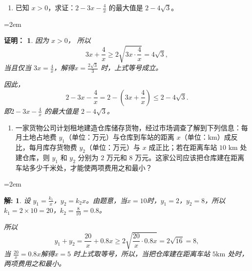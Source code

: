 \documentclass[aspectratio=169,13pt,fleqn,t] {beamer}
\newtheorem*{prooft}{证明：}
\newtheorem*{solve}{解:}
\begin{document}
\begin{frame}
	\begin{enumerate}[7.]
		\item 已知 \(x > 0\)，求证：\(2 - 3x - \frac{4}{x}\) 的最大值是 \(2 - 4\sqrt{3}\)。
	\end{enumerate}
	
	\leftskip=2em
	\begin{minipage}{0.8\textwidth}
		
		\begin{prooft}
			 因为 \(x > 0\)，
			 所以 \[3x + \frac{4}{x} \geqslant 2\sqrt{3x \cdot \frac{4}{x}} = 4\sqrt{3},\]
			 当且仅当 \(3x = \frac{4}{x}\)，解得$x=\frac{2\sqrt{3}}{3}$ 时，上式等号成立。
			 
			 因此，
			 \[
			 2 - 3x - \frac{4}{x} = 2 - \left(3x + \frac{4}{x}\right) \leqslant 2 - 4\sqrt{3}.
			 \]
			 即\(2 - 3x - \frac{4}{x}\) 的最大值是 \(2 - 4\sqrt{3}\)。
		\end{prooft}
	\end{minipage}
	
\end{frame}


\begin{frame}
	\begin{enumerate}[8.]
		\item 一家货物公司计划租地建造仓库储存货物，经过市场调查了解到下列信息：每月土地占地费 \(y_1\)（单位：万元）与仓库到车站的距离 \(x\)（单位：\(\text{km}\)）成反比，每月库存货物费 \(y_2\)（单位：万元）与 \(x\) 成正比；若在距离车站 \(10\text{ km}\) 处建仓库，则 \(y_1\) 和 \(y_2\) 分别为 \(2\) 万元和 \(8\) 万元。这家公司应该把仓库建在距离车站多少千米处，才能使两项费用之和最小？
	\end{enumerate}
	
	\leftskip=2em
	\begin{minipage}{0.9\textwidth}
		
		\begin{solve}
			设 \(y_1 = \frac{k_1}{x}\)，\(y_2 = k_2x\)。由题意，当$x=10$时，$y_1=2$，$y_2=8$，所以$k_1 = 2\times 10 = 20$，$k_2= \frac{8}{10} = 0.8$。
			
			所以
			 \[y_1 + y_2 =\frac{20}{x} + 0.8x \geqslant 2\sqrt{\frac{20}{x}\cdot 0.8x} = 2\sqrt{16} = 8,\]
			 当 $\frac{20}{x} = 0.8x$解得\(x = 5\) 时上式取等号，所以，当把仓库建在距离车站 $5\mathrm{km}$ 处时，两项费用之和最小。
		\end{solve}
	\end{minipage}
	
\end{frame}
\end{document}

